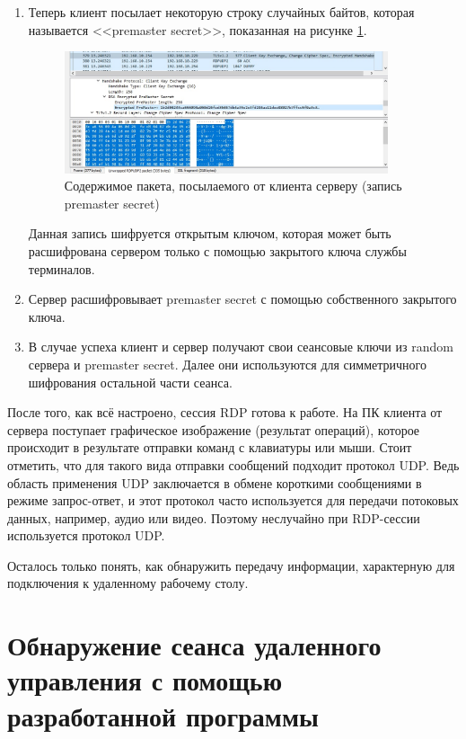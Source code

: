 \documentclass[bachelor, och, coursework]{SCWorks}
\begin{document}
\begin{enumerate}
    \item Теперь клиент посылает некоторую строку случайных байтов, которая называется <<premaster secret>>, показанная на рисунке \ref{cert1}. 
    
    \begin{figure}[H]
      \centering
      \includegraphics[width=0.9\textwidth]{photo/cert1.png}
      \caption{Содержимое пакета, посылаемого от клиента серверу (запись premaster secret)}
      \label{cert1}
    \end{figure}
    
    Данная запись шифруется открытым ключом, которая может быть расшифрована сервером только с помощью закрытого ключа службы терминалов.
    \item Сервер расшифровывает premaster secret с помощью собственного закрытого ключа.
    \item В случае успеха клиент и сервер получают свои сеансовые ключи из random сервера и premaster secret. Далее они используются для симметричного 
    шифрования остальной части сеанса.
  \end{enumerate}
  
  После того, как всё настроено, сессия RDP готова к работе. На ПК клиента от сервера поступает графическое изображение
  (результат операций), которое происходит в результате отправки команд с клавиатуры или мыши. Стоит отметить, что для такого вида отправки сообщений
  подходит протокол UDP. Ведь область применения UDP заключается в обмене короткими сообщениями в режиме запрос-ответ, и этот протокол часто используется
  для передачи потоковых данных, например, аудио или видео. Поэтому неслучайно при RDP-сессии используется протокол UDP. 
  
  Осталось только понять, как обнаружить передачу информации, характерную для подключения к удаленному рабочему столу.

  \section{Обнаружение сеанса удаленного управления с помощью разработанной программы}
  
\end{document}
